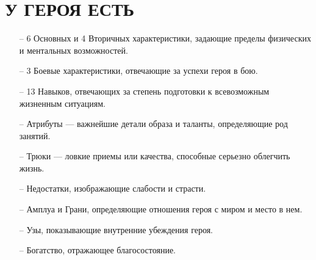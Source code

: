 \section{У ГЕРОЯ ЕСТЬ}
\begin{itemize}
\item[--] 6 Основных и 4 Вторичных характеристики, задающие пределы физических и ментальных возможностей.
\item[--] 3 Боевые характеристики, отвечающие за успехи героя в бою.
\item[--] 13 Навыков, отвечающих за степень подготовки к всевозможным жизненным ситуациям.
\item[--] Атрибуты — важнейшие детали образа и таланты, определяющие род занятий.
\item[--] Трюки — ловкие приемы или качества, способные серьезно облегчить жизнь.
\item[--] Недостатки, изображающие слабости и страсти.
\item[--] Амплуа и Грани, определяющие отношения героя с миром и место в нем.
\item[--] Узы, показывающие внутренние убеждения героя.
\item[--] Богатство, отражающее благосостояние.
\end{itemize}
